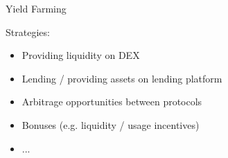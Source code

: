 \documentclass[handout]{beamer}
\begin{document}

\begin{frame}{Yield Farming}

Strategies: \\ \vspace{1em}

	\begin{itemize}
	

		\item<1-> Providing liquidity on DEX
		\item<2-> Lending / providing assets on lending platform
		\item<3-> Arbitrage opportunities between protocols
		\item<4-> Bonuses (e.g. liquidity / usage incentives)
		\item<4->...
	\end{itemize}


	
\end{frame}
\end{document}
